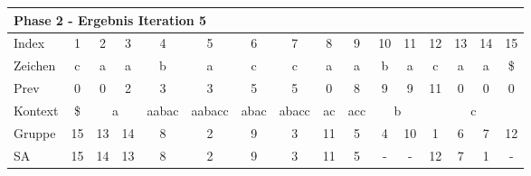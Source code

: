 \begin{table}[H]
\centering
\begin{adjustbox}{max width=\textwidth}
\centering
\begin{tabular}{lccccccccccccccc}
\multicolumn{16}{l}{Phase 2 - Ergebnis Iteration 5}                                                                                                                                                                                                                                                                                                         \\ \hline
\multicolumn{1}{l|}{Index}   & 1                       & 2  & 3                       & 4                          & 5                                              & 6                         & 7                          & 8                       & 9                        & 10 & 11                      & 12 & 13 & 14                        & 15 \\
\multicolumn{1}{l|}{Zeichen} & c                       & a  & a                       & b                          & a                                              & c                         & c                          & a                       & a                        & b  & a                       & c  & a  & a                         & \$ \\
\multicolumn{1}{l|}{Prev}    & 0                       & 0  & 2                       & 3                          & 3                                              & 5                         & 5                          & 0                       & 8                        & 9  & 9                       & 11 & 0  & 0                         & 0  \\ \hline
\multicolumn{1}{l|}{Kontext} & \multicolumn{1}{c|}{\$} & \multicolumn{2}{c|}{a}       & \multicolumn{1}{c|}{aabac} & \multicolumn{1}{c|}{aabacc}                    & \multicolumn{1}{c|}{abac} & \multicolumn{1}{c|}{abacc} & \multicolumn{1}{c|}{ac} & \multicolumn{1}{c|}{acc} & \multicolumn{2}{c|}{b}       & \multicolumn{4}{c}{c}                    \\
\multicolumn{1}{l|}{Gruppe}  & \multicolumn{1}{c|}{15} & 13 & \multicolumn{1}{c|}{14} & \multicolumn{1}{c|}{8}     & \multicolumn{1}{c|}{2}                         & \multicolumn{1}{c|}{9}    & \multicolumn{1}{c|}{3}     & \multicolumn{1}{c|}{11} & \multicolumn{1}{c|}{5}   & 4  & \multicolumn{1}{c|}{10} & 1  & 6  & 7                         & 12 \\
\multicolumn{1}{l|}{SA}      & \multicolumn{1}{c|}{15} & 14 & \multicolumn{1}{c|}{13} & \multicolumn{1}{c|}{8}     & \multicolumn{1}{c|}{\cellcolor[HTML]{\green}2} & \multicolumn{1}{c|}{9}    & \multicolumn{1}{c|}{3}     & \multicolumn{1}{c|}{11} & \multicolumn{1}{c|}{5}   & -  & \multicolumn{1}{c|}{-}  & 12 & 7  & \cellcolor[HTML]{\red}1 & - 
\end{tabular}
\end{adjustbox}


\end{table}
